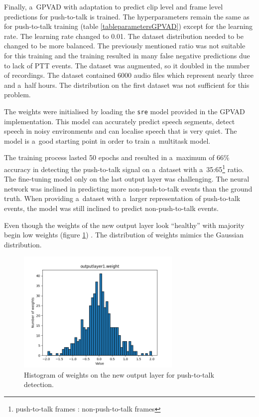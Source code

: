     Finally, a~GPVAD with adaptation to predict clip level and frame level predictions for push-to-talk is trained. The hyperparameters remain the same as for push-to-talk training (table \ref{tableparametersGPVAD}) except for the learning rate. The learning rate changed to 0.01. The dataset distribution needed to be changed to be more balanced. The previously mentioned ratio was not suitable for this training and the training resulted in many false negative predictions due to lack of PTT events. The dataset was augmented, so it doubled in the number of recordings. The dataset contained 6000 audio files which represent nearly three and a~half hours. The distribution on the first dataset was not sufficient for this problem. 

    The weights were initialised by loading the \texttt{sre} model provided in the GPVAD implementation. This model can accurately predict speech segments, detect speech in noisy environments and can localise speech that is very quiet. The model is a~good starting point in order to train a~multitask model. 

    The training process lasted 50 epochs and resulted in a~maximum of 66\% accuracy in detecting the push-to-talk signal on a~dataset with a~35:65\footnote{push-to-talk frames : non-push-to-talk frames} ratio. The fine-tuning model only on the last output layer was challenging. The neural network was inclined in predicting more non-push-to-talk events than the ground truth. When providing a~dataset with a~larger representation of push-to-talk events, the model was still inclined to predict non-push-to-talk events. 
    
    \newpage
    Even though the weights of the new output layer look ``healthy'' with majority begin low weights (figure \ref{fig:weightsoutput1}) \cite{applyingnn}. The distribution of weights mimics the Gaussian distribution.  
    
    \begin{figure}[ht!]
        \centering
        \includegraphics[width = 0.7\textwidth]{obrazky-figures/histogramoutputlayer1.png}
        \caption{Histogram of weights on the new output layer for push-to-talk detection.}
        \label{fig:weightsoutput1}
    \end{figure}

